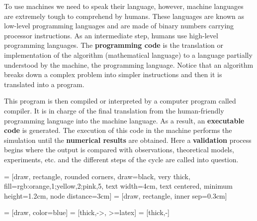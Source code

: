 To use machines we need to speak their language, however, machine languages are extremely tough to comprehend by humans.
These languages are known as low-level programming languages and are made of binary numbers carrying processor instructions. 
As an intermediate step, humans use high-level programming languages.
The \textbf{programming code} is the translation or implementation of the algorithm (mathematical language) 
to a language partially understood by the machine, the programming language. 
Notice that an algorithm breaks down a complex problem into simpler instructions 
and then it is translated into a program. 

This program is then compiled or interpreted by a computer program called compiler. 
It is in charge of the final translation from the human-friendly programming language 
into the machine language. As a result, an \textbf{executable code} is generated.
The execution of this code in the machine performs the simulation until the \textbf{numerical results} are obtained.
Here a \textbf{validation} process begins where the output is compared with observations, theoretical models, experiments, etc. 
and the different steps of the cycle are called into question.



 
\usetikzlibrary{shapes.geometric, arrows}

\usetikzlibrary{positioning} 

 = [draw, rectangle, rounded corners, draw=black, very thick,
fill={rgb:orange,1;yellow,2;pink,5},
text width=4cm, text centered, minimum height=1.2cm, node distance=3cm]
 = [draw, rectangle, inner sep=0.3cm]

 = [draw, color=blue]
 = [thick,->, >=latex]
 = [thick,-]
 
